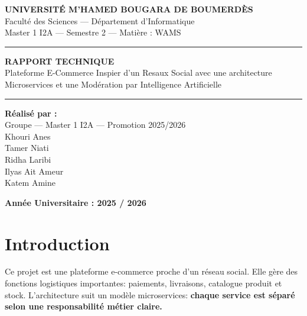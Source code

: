 \documentclass[11pt,a4paper]{article}
\begin{document}
\begin{titlepage}
    \centering
    \vspace*{1cm}

    {\Large \textbf{UNIVERSITÉ M'HAMED BOUGARA DE BOUMERDÈS}}\\[0.5cm]
    {\large Faculté des Sciences --- Département d'Informatique}\\[0.2cm]
    {\large Master 1 I2A --- Semestre 2 --- Matière : WAMS}\\[2.5cm]

    \hrule
    \vspace{0.8cm}
    {\Huge \textbf{RAPPORT TECHNIQUE}}\\[0.8cm]
    {\Large Plateforme E-Commerce Inspier d'un Resaux Social avec une architecture Microservices et une Modération par Intelligence Artificielle}
    \vspace{0.8cm}
    \hrule

    \vspace{3cm}

    \begin{flushleft}
        \Large \textbf{Réalisé par :}\\[0.5cm]
        \large
        Groupe --- Master 1 I2A --- Promotion 2025/2026\\[0.3cm]
        Khouri Anes\\
        Tamer Niati\\
        Ridha Laribi\\
        Ilyas Ait Ameur\\
        Katem Amine
    \end{flushleft}

    \vfill

    {\Large \textbf{Année Universitaire : 2025 / 2026}}

    \vspace*{1cm}
\end{titlepage}

\section{Introduction}
Ce projet est une plateforme e-commerce proche d'un r\'eseau social.
Elle g\`ere des fonctions logistiques importantes: paiements, livraisons, catalogue produit et stock.
L'architecture suit un mod\`ele microservices: \textbf{chaque service est s\'epar\'e selon une responsabilit\'e m\'etier claire.}
\end{document}
